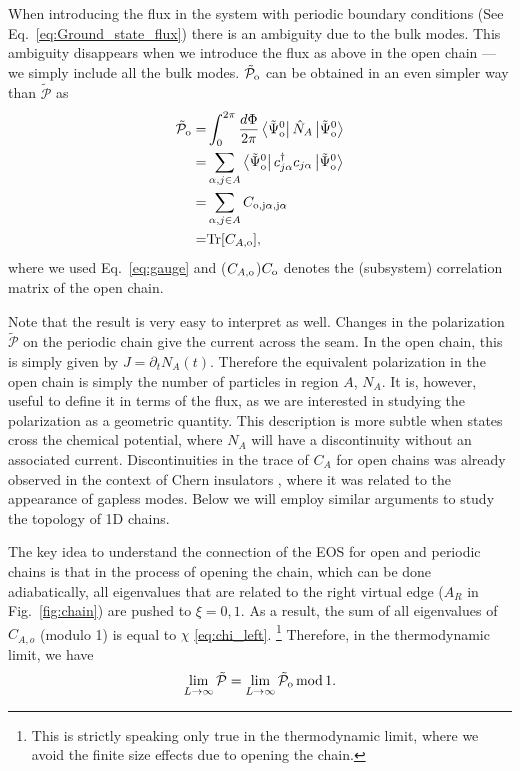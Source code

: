 \documentclass[twocolumn,amsmath,longbibliography,amssymb,superscriptaddress]{revtex4-1}
\newcommand{\tpo}{\tilde{\mathcal{P}}_{\rm o}}
\newcommand{\brapsio}[1]{\bra{\tilde{\Psi}_{{\rm o}}^#1}}
\newcommand{\ketpsio}[1]{\ket{\tilde{\Psi}_{{\rm o}}^#1}}
\begin{document}
When introducing the flux in the system with periodic boundary conditions (See Eq.~\eqref{eq:Ground_state_flux}) there is an ambiguity due to the bulk modes. 
This ambiguity disappears when we introduce the flux as above in the open chain --- we simply include all the bulk modes. 
$\tpo$ can be obtained in an even simpler way than $\tilde{\mathcal{P}}$ as 
\begin{align}\label{eq:phi_independence}
\tpo =&  \int_0^{2\pi}\frac{d\Phi}{2\pi} \brapsio{0} \hat{N}_A \ketpsio{0} \nonumber \\
=&\sum_{\alpha,j\in A}\brapsio{0} c_{j\alpha}^\dagger c_{j\alpha} \ketpsio{0} \nonumber\\
=&\sum_{\alpha,j\in A} C_{\rm o,j\alpha,j\alpha}\nonumber \\
=& {\rm Tr}[C_{A,\rm o}],
\end{align}
where we used Eq.~\eqref{eq:gauge} and ($C_{A,\rm o}$)$C_{\rm o}$ denotes the (subsystem) correlation matrix of the open chain.  

Note that the result is very easy to interpret as well. Changes in the polarization $\tilde{\mathcal{P}}$ on the periodic chain give the current across the seam. In the open chain, this is simply given by $J = \partial_t N_A(t)$. Therefore the equivalent polarization in the open chain is simply the number of particles in region $A$, $N_A$. It is, however, useful to define it in terms of the flux, as we are interested in studying the polarization as a geometric quantity. This description is more subtle when states cross the chemical potential, where $N_A$ will have a discontinuity without an associated current. Discontinuities in the trace of $C_A$ for open chains was already observed in the context of Chern insulators \cite{Alexandrinata2011}, where it was related to the appearance of gapless modes. Below we will employ similar arguments to study the topology of 1D chains. 

The key idea to understand the connection of the EOS for open and periodic chains is that in the process of opening the chain, which can be done adiabatically, all eigenvalues that are related to the right virtual edge ($A_R$ in Fig.~\ref{fig:chain}) are pushed to $\xi=0,1$. 
As a result, the sum of all eigenvalues of $C_{A,o}$ (modulo 1) is equal to $\chi$ \eqref{eq:chi_left}. \footnote{ This is strictly speaking only true in the thermodynamic limit, where we avoid the finite size effects due to opening the chain.} Therefore, in the thermodynamic limit, we have
\begin{equation}
\lim_{L \rightarrow \infty }\tilde{\mathcal{P}} = \lim_{L \rightarrow \infty } \tpo \, {\rm mod} \, 1.
\end{equation}
\end{document}
